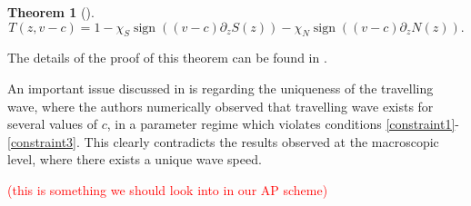 \documentclass[11pt,twoside]{article}
\numberwithin{equation}{section}
\DeclareMathOperator{\sign}{sign}
\theoremstyle{plain}
\newtheorem{theorem}{Theorem}[section]
\theoremstyle{nonumberplain}
\begin{document}
\begin{theorem}[\cite{calvez2016chemotactic}]
\[
    T(z, v-c) = 1 - \chi_S \sign((v-c)\partial_zS(z)) - \chi_N \sign((v-c)\partial_zN(z)) .
\]

\end{theorem}
The details of the proof of this theorem can be found in \cite{calvez2016chemotactic}.

\noindent An important issue discussed in \cite{calvez2018well} is regarding the uniqueness of the travelling wave, where the authors numerically observed that travelling wave exists for several values of $c$, in a parameter regime which violates conditions \eqref{constraint1}-\eqref{constraint3}. This clearly contradicts the results observed at the macroscopic level, where there exists a unique wave speed.  

\textcolor{red}{(this is something we should look into in our AP scheme)}
\end{document}
